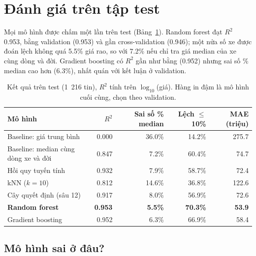 \section{Đánh giá trên tập test}

Mọi mô hình được chấm một lần trên test (Bảng~\ref{tab:tab-test}). Random forest đạt $R^2$ 0.953, bằng validation
(0.953) và gần cross-validation (0.946); một nửa số xe được đoán lệch không quá 5.5\% giá rao, so với 7.2\% nếu chỉ tra
giá median của xe cùng dòng và đời. Gradient boosting có $R^2$ gần như bằng (0.952) nhưng sai số \% median cao hơn
(6.3\%), nhất quán với kết luận ở validation.

\begin{table}[H]\centering
\caption{Kết quả trên test (1~216 tin), $R^2$ tính trên $\log_{10}$(giá). Hàng in đậm là mô hình cuối cùng, chọn theo
validation.}\label{tab:tab-test}
\small
\begin{tabular}{lrrrr}
\toprule
Mô hình & $R^2$ & Sai số \% median & Lệch $\le$ 10\% & MAE (triệu) \\
\midrule
Baseline: giá trung bình & 0.000 & 36.0\% & 14.2\% & 275.7 \\
Baseline: median cùng dòng xe và đời & 0.847 & 7.2\% & 60.4\% & 74.7 \\
Hồi quy tuyến tính & 0.932 & 7.9\% & 58.7\% & 72.4 \\
kNN ($k = 10$) & 0.812 & 14.6\% & 36.8\% & 122.6 \\
Cây quyết định (sâu 12) & 0.917 & 8.0\% & 56.9\% & 72.6 \\
\textbf{Random forest} & \textbf{0.953} & \textbf{5.5\%} & \textbf{70.3\%} & \textbf{53.9} \\
Gradient boosting & 0.952 & 6.3\% & 66.9\% & 58.4 \\
\bottomrule
\end{tabular}
\end{table}



\subsection{Mô hình sai ở đâu?}

